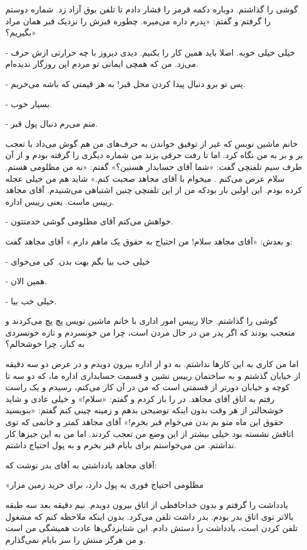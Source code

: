 \documentclass[12pt,a4paper]{book}
\begin{document}
گوشی را گذاشتم. دوباره دکمه قرمز را فشار دادم تا تلفن بوق آزاد زد. شماره دوستم را گرفتم و گفتم: «پدرم داره می‌میره. چطوره قبرش را نزدیک قبر همان مراد بگیریم؟»

- خیلی خیلی خوبه. اصلا باید همین کار را بکنیم. دیدی دیروز با چه حرارتی ازش حرف می‌زد. من که همچی ایمانی تو مردم این روزگار ندیده‌ام.

- پس تو برو دنبال پیدا کردن محل قبر! به هر قیمتی که باشه می‌خریم.

- بسیار خوب.

- منم می‌رم دنبال پول قبر.

خانم ماشین نویس که غیر از توفیق خواندن به حرف‌های من هم گوش می‌داد با تعجب بر و بر به من نگاه کرد. اما تا رفت حرفی بزند من شماره دیگری را گرفته بودم و از آن طرف سیم تلفنچی گفت: «شما آقای حسابدار هستین؟» گفتم: «نه من مظلومی هستم. سلام عرض می‌کنم . میخوام با آقای مجاهد صحبت کنم.» شاید هم من خیلی عجله کرده بودم. این اولین بار بودکه من از این تلفنچی چنین اشتباهی می‌شنیدم. آقای مجاهد رییس ماست. یعنی رییس اداره.

- خواهش می‌کنم آقای مظلومی گوشی خدمتتون.

و بعدش: «آقای مجاهد سلام! من احتیاج به حقوق یک ماهم دارم.» آقای مجاهد گفت: 

- خیلی خب بیا بگم بهت بدن. کی می‌خوای

- همین الان.

- خیلی خب بیا.

گوشی را گذاشتم. حالا رییس امور اداری با خانم ماشین نویس پچ پچ می‌کردند و متعجب بودند که اگر پدر من در حال مردن است، چرا من خونسردم و تازه خونسردی به کنار، چرا خوشحالم؟

اما من کاری به این کارها نداشتم. به دو از اداره بیرون دویدم و در عرض دو سه دقیقه از خیابان گذشتم و به ساختمان رییس نشین و قسمت حسابداری اداره ما، که دو سه تا کوچه و خیابان دورتر از قسمتی است که من در آن کار می‌کنم، رسیدم و یک راست رفتم به اتاق آقای مجاهد. در را باز کردم و گفتم: «سلام!» و خیلی عادی و شاید خوشحالتر از هر وقت بدون اینکه توضیحی بدهم و زمینه چینی کنم گفتم:
«بنویسید حقوق این ماه منو بم بدن می‌خوام قبر بخرم!» آقای مجاهد کمتر و خانمی که توی اتاقش نشسته بود خیلی بیشتر از این وضع من تعجب کردند. اما من به این جیزها کار نداشتم. من می‌خواستم برای بابام قبر بخرم و به پول احتیاج داشتم.

آقای مجاهد یادداشتی به آقای بدر نوشت که:

«مظلومی احتیاج فوری به پول دارد، برای خرید زمین مزار 

یادداشت را گرفتم و بدون خداحافظی از اتاق بیرون دویدم. نیم دقیقه بعد سه طبقه بالاتر توی اتاق بدر بودم. بدر داشت تلفن می‌کرد. بدون اینکه ملاحظه کنم که مشغول تلفن کردن است، یادداشت را دستش دادم. این شتابزدگی‌ها عادت همیشگی من است و من هرگز منتش را سر بابام نمی‌گذارم.
\end{document}
